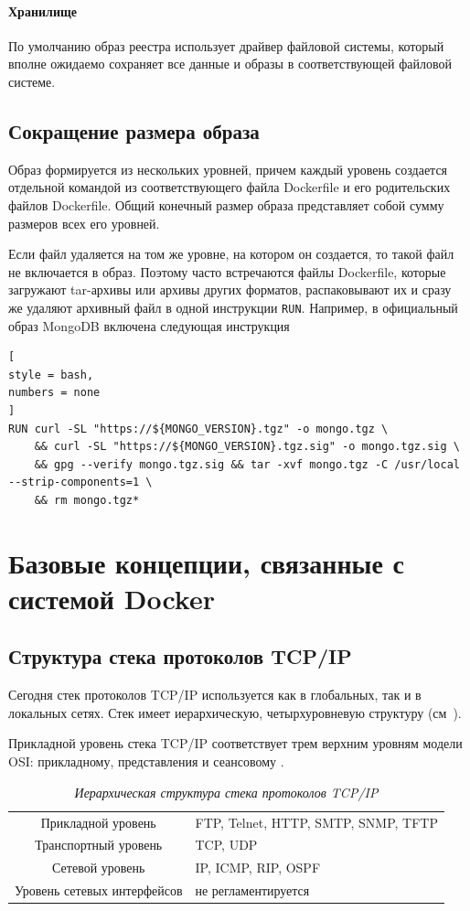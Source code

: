 \documentclass[%
	11pt,
	a4paper,
	utf8,
		]{article}
\begin{document}
\paragraph{Хранилище} По умолчанию образ реестра использует драйвер файловой системы, который вполне ожидаемо сохраняет все данные и образы в соответствующей файловой системе.

\subsection{Сокращение размера образа}

Образ формируется из нескольких уровней, причем каждый уровень создается отдельной командой из соответствующего файла Dockerfile и его родительских файлов Dockerfile. Общий конечный размер образа представляет собой сумму размеров всех его уровней.

Если файл удаляется на том же уровне, на котором он создается, то такой файл не включается в образ. Поэтому часто встречаются файлы Dockerfile, которые загружают tar-архивы или архивы других форматов, распаковывают их и сразу же удаляют архивный файл в одной инструкции \texttt{RUN}. Например, в официальный образ MongoDB включена следующая инструкция
\begin{lstlisting}[
style = bash,
numbers = none
]
RUN curl -SL "https://${MONGO_VERSION}.tgz" -o mongo.tgz \
    && curl -SL "https://${MONGO_VERSION}.tgz.sig" -o mongo.tgz.sig \
    && gpg --verify mongo.tgz.sig && tar -xvf mongo.tgz -C /usr/local --strip-components=1 \
    && rm mongo.tgz*
\end{lstlisting}


\section{Базовые концепции, связанные с системой Docker}

\subsection{Структура стека протоколов TCP/IP}

Сегодня стек протоколов TCP/IP используется как в глобальных, так и в локальных сетях. Стек имеет иерархическую, четырхуровневую структуру (см~).

Прикладной уровень стека TCP/IP соответствует трем верхним уровням модели OSI: прикладному, представления и сеансовому \cite{olifer:compnets-2020}.

\begin{table}[h]
	\centering
	\caption{\itshape Иерархическая структура стека протоколов TCP/IP}\label{tab:tcpip}
	\begin{tabular}{cl}
		\rowcolor[gray]{0.96} {Прикладной уровень} & FTP, Telnet, HTTP, SMTP, SNMP, TFTP \\
		Транспортный уровень & TCP, UDP \\
		\rowcolor[gray]{0.96} {Сетевой уровень} & IP, ICMP, RIP, OSPF \\
		Уровень сетевых интерфейсов & не регламентируется
	\end{tabular}
\end{table}
\end{document}
